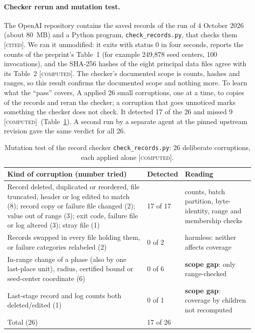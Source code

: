 \documentclass[11pt]{article}
\newcommand{\st}[1]{\textsc{[#1]}}
\newcommand{\stcomp}{\st{computed}}
\newcommand{\stcited}{\st{cited}}
\theoremstyle{definition}
\theoremstyle{remark}
\begin{document}
\paragraph{Checker rerun and mutation test.} The OpenAI repository contains the saved records of the run of 4 October
2026 (about 80~MB) and a Python program, \texttt{check\_records.py}, that checks them \cite{OAI} \stcited. We ran
it unmodified: it exits with status $0$ in four seconds, reports the counts of the preprint's Table~1 (for example 249{,}878
seed centers, 100 invocations), and the SHA-256 hashes of the eight principal data files agree with its Table~2 \stcomp.
The checker's documented scope is counts, hashes and ranges, so this result confirms the documented scope and nothing
more. To learn what the ``pass'' covers, A applied 26 small corruptions, one at a time, to copies of the records and reran
the checker; a corruption that goes unnoticed marks something the checker does not check. It detected 17 of the 26
and missed 9 \stcomp\ (Table~\ref{tab:mutation}). A second run by a separate agent at the pinned upstream revision gave
the same verdict for all 26.

\begin{table}[htbp]
\centering\footnotesize
\begin{tabular}{@{}p{}p{}p{}@{}}
\toprule
Kind of corruption (number tried) & Detected & Reading\\
\midrule
Record deleted, duplicated or reordered, file truncated, header or log edited to match (8); record copy or failure file changed (2); value out of range (3); exit code, failure file or log altered (3); stray file (1) & 17 of 17 & counts, batch partition, byte-identity, range and membership checks\\
Records swapped in every file holding them, or failure categories relabeled (2) & 0 of 2 & harmless: neither affects coverage\\
In-range change of a phase (also by one last-place unit), radius, certified bound or seed-center coordinate (6) & 0 of 6 & \textbf{scope gap}: only range-checked\\
Last-stage record and log counts both deleted/edited (1) & 0 of 1 & \textbf{scope gap}: coverage by children not recomputed\\
\midrule
Total (26) & 17 of 26 & \\
\bottomrule
\end{tabular}
\caption{Mutation test of the record checker \texttt{check\_records.py}: 26 deliberate corruptions, each applied alone
\stcomp.}\label{tab:mutation}
\end{table}
\end{document}
